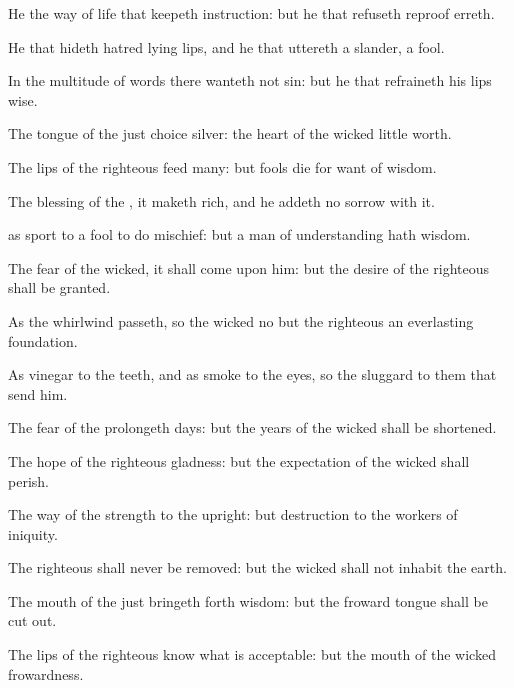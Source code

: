 {He
{} the
way of
life that
keepeth
instruction: but he that
refuseth
reproof
erreth.

He that
hideth
hatred
{}
lying
lips, and he that
uttereth a
slander,
{} a
fool.

In the
multitude of
words there
wanteth not
sin: but he that
refraineth his
lips
{}
wise.


\par }{\PP {}The
tongue of the
just
{}
choice
silver: the
heart of the
wicked
{} little
worth.

The
lips of the
righteous
feed
many: but
fools
die for
want of
wisdom.

The
blessing of the
{}, it maketh
rich, and he
addeth no
sorrow with it.

 as
sport to a
fool to
do
mischief: but a
man of
understanding hath
wisdom.


\par }{\PP {}The
fear of the
wicked, it shall
come upon him: but the
desire of the
righteous shall be
granted.

As the
whirlwind
passeth, so
{} the
wicked no
{} but the
righteous
{} an
everlasting
foundation.

As
vinegar to the
teeth, and as
smoke to the
eyes, so
{} the
sluggard to them that
send him.


\par }{\PP {}The
fear of the
{}
prolongeth
days: but the
years of the
wicked shall be
shortened.

The
hope of the
righteous
{}
gladness: but the
expectation of the
wicked shall
perish.


\par }{\PP {}The
way of the
{}
{}
strength to the
upright: but
destruction
{} to the
workers of
iniquity.

The
righteous shall
never be
removed: but the
wicked shall not
inhabit the
earth.


\par }{\PP {}The
mouth of the
just bringeth
forth
wisdom: but the
froward
tongue shall be cut
out.

The
lips of the
righteous
know what is
acceptable: but the
mouth of the
wicked
{}
frowardness.




}
